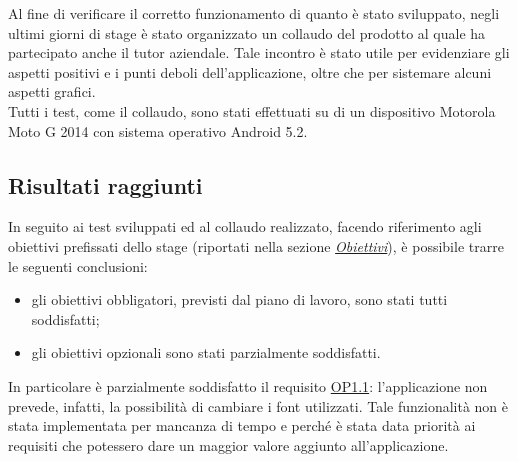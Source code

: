 \documentclass[../Tesi.tex]{subfiles}
\begin{document}
	Al fine di verificare il corretto funzionamento di quanto è stato sviluppato, negli ultimi giorni di stage è stato organizzato un collaudo del prodotto al quale ha partecipato anche il tutor aziendale. Tale incontro è stato utile per evidenziare gli aspetti positivi e i punti deboli dell'applicazione, oltre che per sistemare alcuni aspetti grafici.\\
	Tutti i test, come il collaudo, sono stati effettuati su di un dispositivo Motorola Moto G 2014 con sistema operativo Android 5.2.

	\subsection{Risultati raggiunti}
	In seguito ai test sviluppati ed al collaudo realizzato, facendo riferimento agli obiettivi prefissati dello stage (riportati nella sezione \hyperref[subsec:obiettivi]{\textit{Obiettivi}}), è possibile trarre le seguenti conclusioni:
	\begin{itemize}
		\item gli obiettivi obbligatori, previsti dal piano di lavoro, sono stati tutti soddisfatti;
		\item gli obiettivi opzionali sono stati parzialmente soddisfatti.
	\end{itemize}
	In particolare è parzialmente soddisfatto il requisito \hyperref[op1.1]{OP1.1}: l'applicazione non prevede, infatti, la possibilità di cambiare i font utilizzati. Tale funzionalità non è stata implementata per mancanza di tempo e perché è stata data priorità ai requisiti che potessero dare un maggior valore aggiunto all'applicazione.
\end{document}
